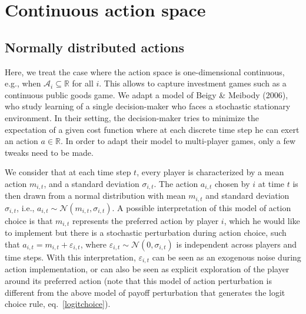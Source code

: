 \documentclass[11pt,reqno]{amsart}
\newcommand{\ac}{a} %
\newcommand{\Ac}{\mathcal{A}} %
\newcommand{\Rn}{\mathds{R}} %
\newcommand{\tm}{t}%
\newcommand{\ma}{m} %
\newcommand{\sd}{\sigma} %
\newcommand{\Nd}{\mathcal{N}} %
\begin{document}
\clearpage


\section{Continuous action space}

\subsection{Normally distributed actions}

Here, we treat the case where the action space is one-dimensional continuous, e.g., when $\Ac_i \subseteq \Rn$ for all $i$. This allows to capture investment games such as a continuous public goods game. We adapt a model of Beigy \& Meibody (2006), who study learning of a single decision-maker who faces a stochastic stationary environment. In their setting, the decision-maker tries to minimize the expectation of a given cost function where at each discrete time step he can exert an action $\ac \in \Rn$. In order to adapt their model to multi-player games, only a few tweaks need to be made.

We consider that at each time step $\tm$, every player is characterized by a mean action $\ma_{i,\tm}$, and a standard deviation $\sd_{i,\tm}$. The action $\ac_{i,\tm}$ chosen by $i$ at time $\tm$ is then drawn from a normal distribution with mean $\ma_{i,\tm}$ and standard deviation $\sd_{i,\tm}$, i.e., $\ac_{i,\tm} \sim \Nd(\ma_{i,\tm},\sd_{i,\tm})$. A possible interpretation of this model of action choice is that $\ma_{i,\tm}$ represents the preferred action by player $i$, which he would like to implement but there is a stochastic perturbation during action choice, such that $\ac_{i,\tm} = \ma_{i,\tm} + \varepsilon_{i,\tm}$, where $\varepsilon_{i,\tm} \sim \Nd(0,\sd_{i,\tm})$ is independent across players and time steps. With this interpretation, $\varepsilon_{i,\tm}$ can be seen as an exogenous noise during action implementation, or can also be seen as explicit exploration of the player around its preferred action (note that this model of action perturbation is different from the above model of payoff perturbation that generates the logit choice rule, eq.~\ref{logitchoice}).
\end{document}
